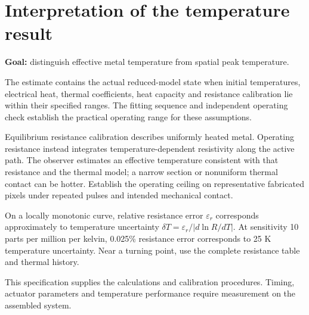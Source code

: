 \documentclass[11pt,letterpaper]{article}
\begin{document}
\section{Interpretation of the temperature result}

\textbf{Goal:} distinguish effective metal temperature from spatial peak temperature.

The estimate contains the actual reduced-model state when initial temperatures, electrical heat, thermal coefficients, heat capacity and resistance calibration lie within their specified ranges. The fitting sequence and independent operating check establish the practical operating range for these assumptions.

Equilibrium resistance calibration describes uniformly heated metal. Operating resistance instead integrates temperature-dependent resistivity along the active path. The observer estimates an effective temperature consistent with that resistance and the thermal model; a narrow section or nonuniform thermal contact can be hotter. Establish the operating ceiling on representative fabricated pixels under repeated pulses and intended mechanical contact.

On a locally monotonic curve, relative resistance error \(\varepsilon_r\) corresponds approximately to temperature uncertainty \(\delta T=\varepsilon_r/|d\ln R/dT|\). At sensitivity 10 parts per million per kelvin, 0.025\% resistance error corresponds to 25 K temperature uncertainty. Near a turning point, use the complete resistance table and thermal history.

This specification supplies the calculations and calibration procedures. Timing, actuator parameters and temperature performance require measurement on the assembled system.
\end{document}
